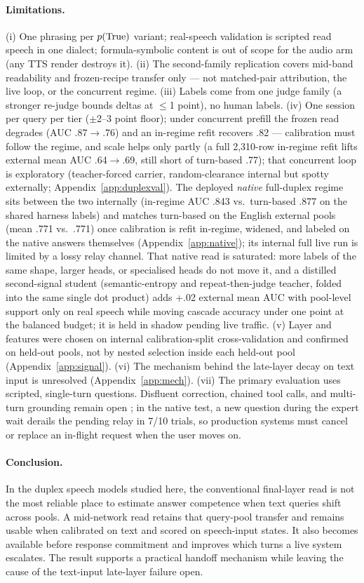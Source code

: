 \paragraph{Limitations.}
(i) One phrasing per $p(\mathrm{True})$ variant; real-speech validation is
scripted read speech in one dialect; formula-symbolic content is out of
scope for the audio arm (any TTS render destroys it). (ii) The
second-family replication covers mid-band readability and frozen-recipe
transfer only --- not matched-pair attribution, the live loop, or the
concurrent regime. (iii) Labels come from one judge family (a stronger
re-judge bounds deltas at $\le$1 point), no human labels.
(iv) One session per query per tier ($\pm$2--3 point floor); under
concurrent prefill the frozen read degrades (AUC .87$\to$.76) and an
in-regime refit recovers .82 --- calibration must follow the regime,
and scale helps only partly (a full 2{,}310-row in-regime refit
lifts external mean AUC .64$\to$.69, still short of turn-based .77);
that concurrent loop is exploratory (teacher-forced carrier,
random-clearance internal but spotty externally;
Appendix~\ref{app:duplexval}). The deployed \emph{native} full-duplex
regime sits between the two internally (in-regime AUC .843 vs.\
turn-based .877 on the shared harness labels) and matches turn-based
on the English external pools (mean .771 vs.\ .771) once calibration
is refit in-regime, widened, and labeled on the native answers
themselves (Appendix~\ref{app:native}); its internal full live
run is limited by a lossy relay channel. That native read is saturated: more labels of the same shape, larger heads, or specialised heads do not move it, and a distilled second-signal student (semantic-entropy and repeat-then-judge teacher, folded into the same single dot product) adds +.02 external mean AUC with pool-level support only on real speech while moving cascade accuracy under one point at the balanced budget; it is held in shadow pending live traffic. (v) Layer and features were
chosen on internal calibration-split
cross-validation and confirmed on held-out pools, not by nested
selection inside each held-out pool (Appendix~\ref{app:signal}).
(vi) The mechanism behind the late-layer decay on text input is unresolved
(Appendix~\ref{app:mech}). (vii) The primary evaluation uses scripted,
single-turn questions. Disfluent correction, chained tool calls, and
multi-turn grounding remain open
\citep{lin2026fdbv3}; in the native test, a new question during the
expert wait derails the pending relay in 7/10 trials, so production
systems must cancel or replace an in-flight request when the user moves
on.

\paragraph{Conclusion.}
In the duplex speech models studied here, the conventional final-layer
read is not the most reliable place to estimate answer competence when
text queries shift across pools. A mid-network read retains that
query-pool transfer and remains usable when calibrated on text and
scored on speech-input states. It also becomes available before response
commitment and improves which turns a live system escalates. The result
supports a practical handoff mechanism while leaving the cause of the
text-input late-layer failure open.

